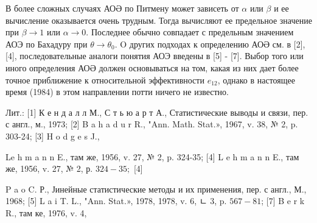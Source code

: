 \documentclass[10pt]{article}
\begin{document}
В более сложных случаях АОӘ по Питмену может зависеть от $\alpha$ или $\beta$ и ее вычисление оказывается очень трудным. Тогда вычисляют ее предельное значение при $\beta \rightarrow 1$ или $\alpha \rightarrow 0$. Последнее обычно совпадает с предельным значением АОЭ по Бахадуру при $\theta \rightarrow \theta_{0}$. O других подходах к определению АОӘ см. в [2], [4], последовательные аналоги понятия АОЭ введены в [5] - [7]. Выбор того или иного определения АОӘ должен основываться на том, какая из них дает более точное приближение к относительной эффективности $e_{12}$, однако в настоящее время (1984) в этом направлении потти ничего не известно.



Лит.: [1] К е н д а л л М., С т ь ю а р т А., Статистические выводы и связи, пер. с англ., м., 1973; [2] B a h a d u r R., "Ann. Math. Stat.», 1967, v. 38, № 2, p. 303-24; [3] H o d g e s J.,

Le h m a n n E., там же, 1956, v. 27, № 2, p. 324-35; [4] L e h m a n n E., там же, 1956, v. 27, № 2, р. $324-35 ;$ [4]

P a o C. Р., Јинейные статистические методы и их применения, пер. с англ., М., 1968; [5] L a i T. L., "Ann. Stat.», 1978, 1978, v. 6, ㄴ 3, p. $567-81$; [7] B e r k R., там ке, 1976, v. 4,
\end{document}
